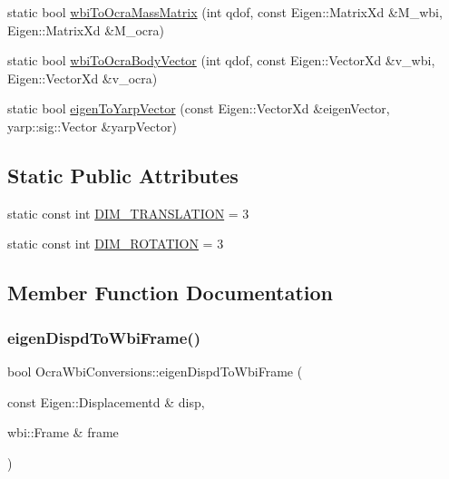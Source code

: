 \begin{DoxyCompactItemize}
static bool \hyperlink{classocra__icub_1_1OcraWbiConversions_abaa2b7a9069b60cfb36cb21e89b98177}{wbi\+To\+Ocra\+Mass\+Matrix} (int qdof, const Eigen\+::\+Matrix\+Xd \&M\+\_\+wbi, Eigen\+::\+Matrix\+Xd \&M\+\_\+ocra)
\item 
static bool \hyperlink{classocra__icub_1_1OcraWbiConversions_ae8839dfdc97e2239f4ed8a257d32fb21}{wbi\+To\+Ocra\+Body\+Vector} (int qdof, const Eigen\+::\+Vector\+Xd \&v\+\_\+wbi, Eigen\+::\+Vector\+Xd \&v\+\_\+ocra)
\item 
static bool \hyperlink{classocra__icub_1_1OcraWbiConversions_a1197be5b35329fbec85de8ee3c4abbd5}{eigen\+To\+Yarp\+Vector} (const Eigen\+::\+Vector\+Xd \&eigen\+Vector, yarp\+::sig\+::\+Vector \&yarp\+Vector)
\end{DoxyCompactItemize}
\subsection*{Static Public Attributes}
\begin{DoxyCompactItemize}
\item 
static const int \hyperlink{classocra__icub_1_1OcraWbiConversions_a7c628bd1208c5e70be458d4dffda4d06}{D\+I\+M\+\_\+\+T\+R\+A\+N\+S\+L\+A\+T\+I\+ON} = 3
\item 
static const int \hyperlink{classocra__icub_1_1OcraWbiConversions_a05e66392df58e9dda2d4db590bdd65a0}{D\+I\+M\+\_\+\+R\+O\+T\+A\+T\+I\+ON} = 3
\end{DoxyCompactItemize}


\subsection{Member Function Documentation}
\hypertarget{classocra__icub_1_1OcraWbiConversions_af71562a5f3d4f6e649f1cec0a3d9996b}{}\label{classocra__icub_1_1OcraWbiConversions_af71562a5f3d4f6e649f1cec0a3d9996b} 
\subsubsection{\texorpdfstring{eigen\+Dispd\+To\+Wbi\+Frame()}{eigenDispdToWbiFrame()}}
{\footnotesize\ttfamily bool Ocra\+Wbi\+Conversions\+::eigen\+Dispd\+To\+Wbi\+Frame (\begin{DoxyParamCaption}\item[{const Eigen\+::\+Displacementd \&}]{disp,  }\item[{wbi\+::\+Frame \&}]{frame }\end{DoxyParamCaption})\hspace{0.3cm}{\ttfamily [static]}}

